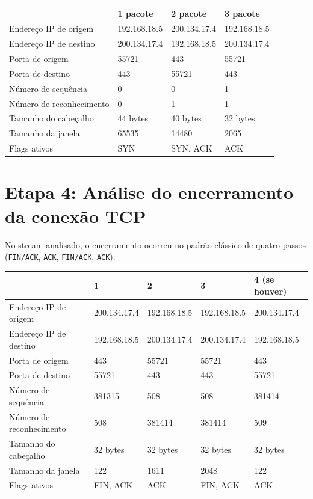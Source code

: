 \documentclass[12pt,a4paper]{article}
\begin{document}
\begin{center}
\renewcommand{\arraystretch}{1.25}
\begin{tabular}{|p{4.6cm}|p{3.2cm}|p{3.2cm}|p{3.2cm}|}
\hline
 & \textbf{1\textordmasculine{} pacote} & \textbf{2\textordmasculine{} pacote} & \textbf{3\textordmasculine{} pacote} \\
\hline
Endereço IP de origem & 192.168.18.5 & 200.134.17.4 & 192.168.18.5 \\
\hline
Endereço IP de destino & 200.134.17.4 & 192.168.18.5 & 200.134.17.4 \\
\hline
Porta de origem & 55721 & 443 & 55721 \\
\hline
Porta de destino & 443 & 55721 & 443 \\
\hline
Número de sequência & 0 & 0 & 1 \\
\hline
Número de reconhecimento & 0 & 1 & 1 \\
\hline
Tamanho do cabeçalho & 44 bytes & 40 bytes & 32 bytes \\
\hline
Tamanho da janela & 65535 & 14480 & 2065 \\
\hline
Flags ativos & SYN & SYN, ACK & ACK \\
\hline
\end{tabular}
\end{center}

\section*{Etapa 4: Análise do encerramento da conexão TCP}

No stream analisado, o encerramento ocorreu no padrão clássico de quatro passos (\texttt{FIN/ACK}, \texttt{ACK}, \texttt{FIN/ACK}, \texttt{ACK}).

\begin{center}
\renewcommand{\arraystretch}{1.25}
\begin{tabular}{|p{4.0cm}|p{2.4cm}|p{2.4cm}|p{2.4cm}|p{2.4cm}|}
\hline
 & \textbf{1\textordmasculine{}} & \textbf{2\textordmasculine{}} & \textbf{3\textordmasculine{}} & \textbf{4\textordmasculine{} (se houver)} \\
\hline
Endereço IP de origem & 200.134.17.4 & 192.168.18.5 & 192.168.18.5 & 200.134.17.4 \\
\hline
Endereço IP de destino & 192.168.18.5 & 200.134.17.4 & 200.134.17.4 & 192.168.18.5 \\
\hline
Porta de origem & 443 & 55721 & 55721 & 443 \\
\hline
Porta de destino & 55721 & 443 & 443 & 55721 \\
\hline
Número de sequência & 381315 & 508 & 508 & 381414 \\
\hline
Número de reconhecimento & 508 & 381414 & 381414 & 509 \\
\hline
Tamanho do cabeçalho & 32 bytes & 32 bytes & 32 bytes & 32 bytes \\
\hline
Tamanho da janela & 122 & 1611 & 2048 & 122 \\
\hline
Flags ativos & FIN, ACK & ACK & FIN, ACK & ACK \\
\hline
\end{tabular}
\end{center}
\end{document}
